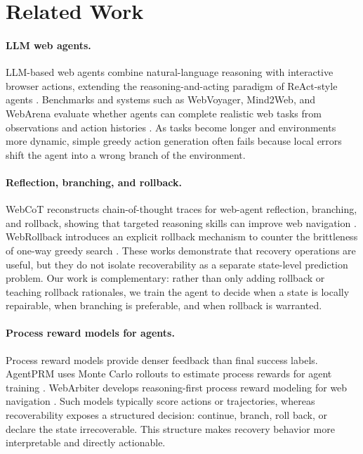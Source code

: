 \documentclass[11pt]{article}
\begin{document}
\section{Related Work}
\paragraph{LLM web agents.}
LLM-based web agents combine natural-language reasoning with interactive browser actions, extending the reasoning-and-acting paradigm of ReAct-style agents \citep{yao2023react}. Benchmarks and systems such as WebVoyager, Mind2Web, and WebArena evaluate whether agents can complete realistic web tasks from observations and action histories \citep{he-etal-2024-webvoyager,deng2023mind2web,zhou2023webarena}. As tasks become longer and environments more dynamic, simple greedy action generation often fails because local errors shift the agent into a wrong branch of the environment.

\paragraph{Reflection, branching, and rollback.}
WebCoT reconstructs chain-of-thought traces for web-agent reflection, branching, and rollback, showing that targeted reasoning skills can improve web navigation \citep{hu-etal-2025-webcot}. WebRollback introduces an explicit rollback mechanism to counter the brittleness of one-way greedy search \citep{zhang-etal-2026-webrollback}. These works demonstrate that recovery operations are useful, but they do not isolate recoverability as a separate state-level prediction problem. Our work is complementary: rather than only adding rollback or teaching rollback rationales, we train the agent to decide when a state is locally repairable, when branching is preferable, and when rollback is warranted.

\paragraph{Process reward models for agents.}
Process reward models provide denser feedback than final success labels. AgentPRM uses Monte Carlo rollouts to estimate process rewards for agent training \citep{choudhury2025agentprm}. WebArbiter develops reasoning-first process reward modeling for web navigation \citep{zhang2026webarbiter}. Such models typically score actions or trajectories, whereas recoverability exposes a structured decision: continue, branch, roll back, or declare the state irrecoverable. This structure makes recovery behavior more interpretable and directly actionable.
\end{document}
